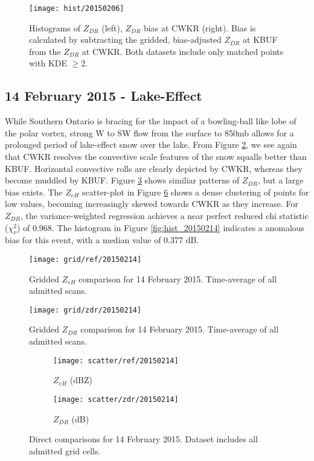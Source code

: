 \begin{figure}[H]
\texttt{[image: hist/20150206]}\centering
\caption{Histograms of $Z_{DR}$ (left), $Z_{DR}$ bias at CWKR (right). Bias is calculated by subtracting the gridded, bias-adjusted $Z_{DR}$ at KBUF from the
$Z_{DR}$ at CWKR. Both datasets include only matched points with KDE $\geq 2$.} 
\label{fig:hist_20150206}
\end{figure}

\subsection{14 February 2015 - Lake-Effect}
While Southern Ontario is bracing for the impact of a bowling-ball like lobe of the polar vortex, strong W to SW flow from the surface to 850mb allows for a prolonged period of lake-effect snow over the lake. From Figure \ref{fig:grid_ref_20150214}, we see again that CWKR resolves the convective scale features of the snow squalls better than KBUF. Horizontal convective rolls are clearly depicted by CWKR, whereas they become muddled by KBUF. Figure \ref{fig:grid_zdr_20150214} shows similiar patterns of $Z_{DR}$, but a large bias exists. The $Z_{eH}$ scatter-plot in Figure \ref{fig:scatter_20150214} shows a dense clustering of points for low values, becoming increasingly skewed towards CWKR as they increase. For $Z_{DR}$, the variance-weighted regression achieves a near perfect reduced chi statistic ($\chi^2_\nu$) of 0.968. The histogram in Figure \ref{fig:hist_20150214} indicates a anomalous bias for this event, with a median value of 0.377 dB.

\begin{figure}[p]
\texttt{[image: grid/ref/20150214]}
\caption{Gridded $Z_{eH}$ comparison for 14 February 2015. Time-average of all admitted scans.} 
\label{fig:grid_ref_20150214}
\end{figure}

\begin{figure}[p]
\texttt{[image: grid/zdr/20150214]}
\caption{Gridded $Z_{DR}$ comparison for 14 February 2015. Time-average of all admitted scans.} 
\label{fig:grid_zdr_20150214}
\end{figure}

\begin{figure}[p]
\centering
   \begin{subfigure}{0.49\linewidth} \centering
     \texttt{[image: scatter/ref/20150214]}
     \caption{$Z_{eH}$ (dBZ)}\label{fig:scatter_ref_20150214}
   \end{subfigure}
   \begin{subfigure}{0.49\linewidth} \centering
     \texttt{[image: scatter/zdr/20150214]}
     \caption{$Z_{DR}$ (dB)}\label{fig:scatter_zdr_20150214}
   \end{subfigure}
\caption{Direct comparisons for 14 February 2015. Dataset includes all admitted grid cells.} \label{fig:scatter_20150214}
\end{figure}

